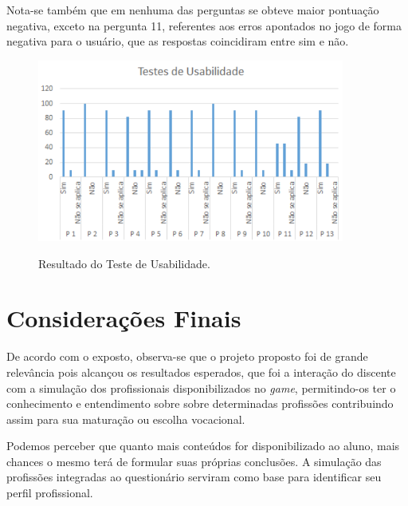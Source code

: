 \documentclass[
	12pt,				%
    oneside,			%
	a4paper,			%
	english,			%
	french,				%
	spanish,			%
	brazil,				%
	]{abntex2}
\begin{document}
Nota-se também que em nenhuma das perguntas se obteve maior pontuação negativa, exceto na pergunta 11, referentes aos erros apontados no jogo de forma negativa para o usuário, que as respostas coincidiram entre sim e não.

\begin{figure} [H] 
\centering

\caption{Resultado do Teste de Usabilidade.}
\includegraphics[width=0.90\textwidth]{usabilidade} %
\label{fig:usabilidade}
\end{figure}


\chapter{Considerações Finais}

De acordo com o exposto, observa-se que o projeto proposto foi de grande relevância pois alcançou os resultados esperados, que foi a interação do discente com a simulação dos profissionais disponibilizados no \textit{game}, permitindo-os ter o conhecimento e entendimento sobre sobre determinadas profissões contribuindo assim para sua maturação ou escolha vocacional. 
 
Podemos perceber que quanto mais conteúdos for disponibilizado ao aluno, mais chances o mesmo terá de formular suas próprias conclusões. A simulação das profissões integradas ao questionário serviram como base para identificar seu perfil profissional.
\end{document}
